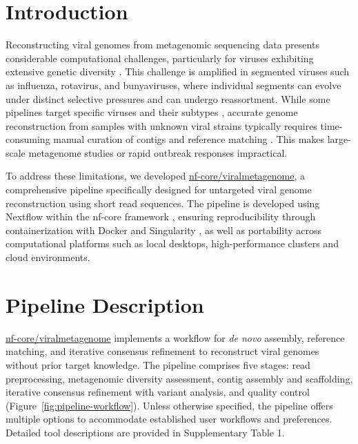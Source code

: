 
\section{Introduction}
Reconstructing viral genomes from metagenomic sequencing data presents considerable computational challenges, particularly for viruses exhibiting extensive genetic diversity \citep{Baaijens2017-hw,Meleshko2021-gb}. This challenge is amplified in segmented viruses such as influenza, rotavirus, and bunyaviruses, where individual segments can evolve under distinct selective pressures and can undergo reassortment. While some pipelines target specific viruses and their subtypes \citep{Shepard2016-uh}, accurate genome reconstruction from samples with unknown viral strains typically requires time-consuming manual curation of contigs and reference matching \citep{de_Vries2021-po}. This makes large-scale metagenome studies or rapid outbreak responses impractical.

To address these limitations, we developed \href{https://github.com/nf-core/viralmetagenome}{nf-core/\allowbreak viralmetagenome}, a comprehensive pipeline specifically designed for untargeted viral genome reconstruction using short read sequences. The pipeline is developed using Nextflow \citep{Di-Tommaso2017-nz} within the nf-core framework \citep{Langer2025-va}, ensuring reproducibility through containerization with Docker \citep{Merkel2014-hn} and Singularity \citep{Kurtzer2017-iw}, as well as portability across computational platforms such as local desktops, high-performance clusters and cloud environments.

\section{Pipeline Description}
\href{https://github.com/nf-core/viralmetagenome}{nf-core/viralmetagenome} implements a workflow for \textit{de novo} assembly, reference matching, and iterative consensus refinement to reconstruct viral genomes without prior target knowledge. The pipeline comprises five stages: read preprocessing, metagenomic diversity assessment, contig assembly and scaffolding, iterative consensus refinement with variant analysis, and quality control (Figure~\ref{fig:pipeline-workflow}). Unless otherwise specified, the pipeline offers multiple options to accommodate established user workflows and preferences. Detailed tool descriptions are provided in Supplementary Table 1.


